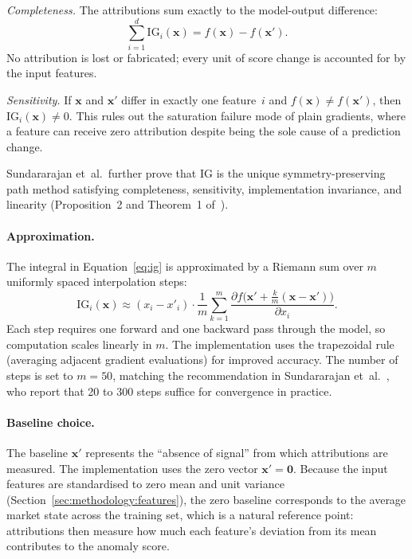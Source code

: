 \documentclass[11pt]{report}
\begin{document}
\textit{Completeness.}
The attributions sum exactly to the model-output difference:
\begin{equation}
  \label{eq:ig_completeness}
  \sum_{i=1}^{d} \mathrm{IG}_i(\mathbf{x}) = f(\mathbf{x}) - f(\mathbf{x}').
\end{equation}
No attribution is lost or fabricated; every unit of score change is accounted for by the input features.

\textit{Sensitivity.}
If $\mathbf{x}$ and $\mathbf{x}'$ differ in exactly one feature~$i$ and $f(\mathbf{x}) \neq f(\mathbf{x}')$, then $\mathrm{IG}_i(\mathbf{x}) \neq 0$.
This rules out the saturation failure mode of plain gradients, where a feature can receive zero attribution despite being the sole cause of a prediction change.

Sundararajan et~al.\ further prove that IG is the unique symmetry-preserving path method satisfying completeness, sensitivity, implementation invariance, and linearity (Proposition~2 and Theorem~1 of~\cite{sundararajan2017axiomaticattributiondeepnetworks}).

\paragraph{Approximation.}
The integral in Equation~\eqref{eq:ig} is approximated by a Riemann sum over $m$ uniformly spaced interpolation steps:
\begin{equation}
  \label{eq:ig_approx}
  \mathrm{IG}_i(\mathbf{x}) \approx (x_i - x'_i) \cdot \frac{1}{m} \sum_{k=1}^{m} \frac{\partial f\!\bigl(\mathbf{x}' + \tfrac{k}{m}(\mathbf{x} - \mathbf{x}')\bigr)}{\partial x_i}.
\end{equation}
Each step requires one forward and one backward pass through the model, so computation scales linearly in $m$. The implementation uses the trapezoidal rule (averaging adjacent gradient evaluations) for improved accuracy. The number of steps is set to $m = 50$, matching the recommendation in Sundararajan et~al.~\cite{sundararajan2017axiomaticattributiondeepnetworks}, who report that 20 to 300 steps suffice for convergence in practice.

\paragraph{Baseline choice.}
The baseline $\mathbf{x}'$ represents the ``absence of signal'' from which attributions are measured. The implementation uses the zero vector $\mathbf{x}' = \mathbf{0}$. Because the input features are standardised to zero mean and unit variance (Section~\ref{sec:methodology:features}), the zero baseline corresponds to the average market state across the training set, which is a natural reference point: attributions then measure how much each feature's deviation from its mean contributes to the anomaly score.
\end{document}
